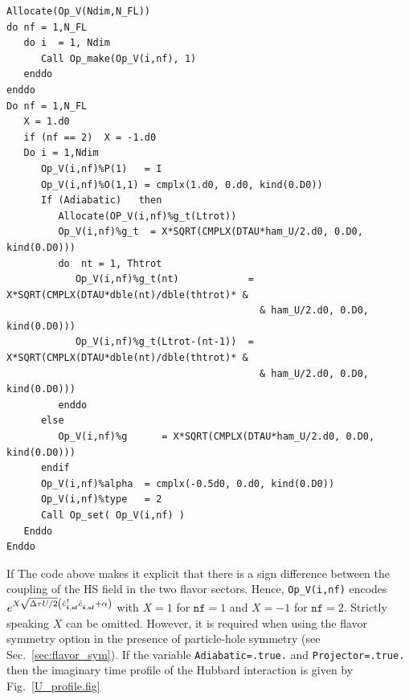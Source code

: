 \begin{lstlisting}[style=fortran]
Allocate(Op_V(Ndim,N_FL))
do nf = 1,N_FL
   do i  = 1, Ndim
      Call Op_make(Op_V(i,nf), 1)
   enddo
enddo
Do nf = 1,N_FL
   X = 1.d0
   if (nf == 2)  X = -1.d0
   Do i = 1,Ndim
      Op_V(i,nf)%P(1)   = I
      Op_V(i,nf)%O(1,1) = cmplx(1.d0, 0.d0, kind(0.D0))
      If (Adiabatic)   then
         Allocate(OP_V(i,nf)%g_t(Ltrot))
         Op_V(i,nf)%g_t  = X*SQRT(CMPLX(DTAU*ham_U/2.d0, 0.D0, kind(0.D0)))
         do  nt = 1, Thtrot
            Op_V(i,nf)%g_t(nt)            = X*SQRT(CMPLX(DTAU*dble(nt)/dble(thtrot)* & 
                                            & ham_U/2.d0, 0.D0, kind(0.D0)))
            Op_V(i,nf)%g_t(Ltrot-(nt-1))  = X*SQRT(CMPLX(DTAU*dble(nt)/dble(thtrot)* &
                                            & ham_U/2.d0, 0.D0, kind(0.D0)))
         enddo
      else
         Op_V(i,nf)%g      = X*SQRT(CMPLX(DTAU*ham_U/2.d0, 0.D0, kind(0.D0))) 
      endif
      Op_V(i,nf)%alpha  = cmplx(-0.5d0, 0.d0, kind(0.D0))
      Op_V(i,nf)%type   = 2
      Call Op_set( Op_V(i,nf) )
   Enddo
Enddo
\end{lstlisting}
If 
The code above makes it explicit that there is a sign difference between the coupling of the HS field in the two flavor sectors.        Hence,  
\texttt{Op\_V(i,nf)}     encodes    $ e^{  X \sqrt{\Delta   \tau U/2} \left( \hat{c}^{\dagger}_{\ve{i},{\texttt{nf}}}  \hat{c}^{\phantom\dagger}_{\ve{i},{\texttt{nf}}}  + \alpha  \right) }  $    with  $X=1 $  for  $\texttt{nf}=1$  and $X=-1 $  for  $\texttt{nf}=2$.    Strictly  speaking  $X$  can  be  omitted.  However,  it  is  required  when  using the  flavor  symmetry  option in the presence  of  particle-hole  symmetry (see  Sec.~\ref{sec:flavor_sym}).     If  the  variable  
\texttt{Adiabatic=.true.}     and  \texttt{Projector=.true.}   then the   imaginary time    profile  of  the  Hubbard interaction  is  given by   Fig.~\ref{U_profile.fig}


